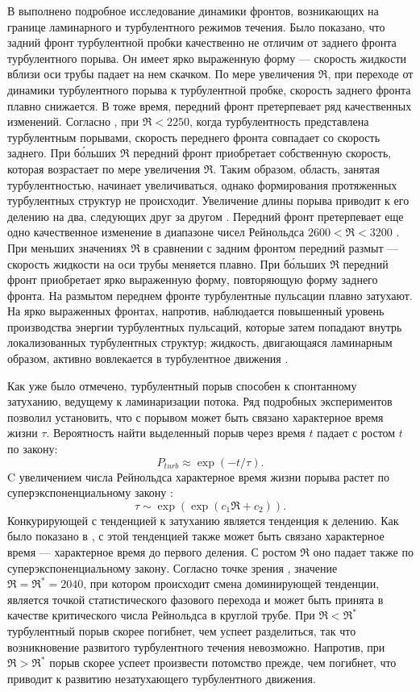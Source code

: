 В \cite{Moxey2010, Barkley2015, Song2017} выполнено подробное исследование динамики фронтов, возникающих на границе ламинарного и турбулентного режимов течения. Было показано, что задний фронт турбулентной пробки качественно не отличим от заднего фронта турбулентного порыва. Он имеет ярко выраженную форму --- скорость жидкости вблизи оси трубы падает на нем скачком. По мере увеличения $\Re$, при переходе от динамики турбулентного порыва к турбулентной пробке, скорость заднего фронта плавно снижается. В тоже время, передний фронт претерпевает ряд качественных изменений. Согласно \cite{Moxey2010}, при $\Re < 2250$, когда турбулентность представлена турбулентным порывами, скорость переднего фронта совпадает со скорость заднего. При б\'{о}льших $\Re$ передний фронт приобретает собственную скорость, которая возрастает по мере увеличения $\Re$. Таким образом, область, занятая турбулентностью, начинает увеличиваться, однако формирования протяженных турбулентных структур не происходит. Увеличение длины порыва приводит к его делению на два, следующих друг за другом \cite{Moxey2010}. Передний фронт претерпевает еще одно качественное изменение в диапазоне чисел Рейнольдса $2600 < \Re < 3200$ \cite{Barkley2015}. При меньших значениях $\Re$ в сравнении с задним фронтом передний размыт --- скорость жидкости на оси трубы меняется плавно. При б\'{о}льших $\Re$ передний фронт приобретает ярко выраженную форму, повторяющую форму заднего фронта. На размытом переднем фронте турбулентные пульсации плавно затухают. На ярко выраженных фронтах, напротив, наблюдается повышенный уровень производства энергии турбулентных пульсаций, которые затем попадают внутрь локализованных турбулентных структур; жидкость, двигающаяся ламинарным образом, активно вовлекается в турбулентное движения \cite{Song2017}. 

Как уже было отмечено, турбулентный порыв способен к спонтанному затуханию, ведущему к ламинаризации потока. Ряд подробных экспериментов \cite{Hof2006finite, Willis2007, Peixinho2007} позволил установить, что с порывом может быть связано характерное время жизни $\tau$. Вероятность найти выделенный порыв через время $t$ падает с ростом $t$ по закону:
$$P_{turb} \approx \exp(-t/\tau).$$ 
C увеличением числа Рейнольдса характерное время жизни порыва растет по суперэкспоненциальному закону \cite{Hof2008, Kuik2010}:
$$\tau \sim \exp(\exp(c_1 \Re + c_2)).$$ 
Конкурирующей с тенденцией к затуханию является тенденция к делению. Как было показано в \cite{Avila2011}, с этой тенденцией также может быть связано характерное время --- характерное время до первого деления. С ростом $\Re$ оно падает также по суперэкспоненциальному закону. Согласно точке зрения \cite{Avila2011}, значение $\Re=\Re^*=2040$, при котором происходит смена доминирующей тенденции, является точкой статистического фазового перехода и может быть принята в качестве критического числа Рейнольдса в круглой трубе. При $\Re<\Re^*$ турбулентный порыв скорее погибнет, чем успеет разделиться, так что возникновение развитого турбулентного течения невозможно. Напротив, при $\Re>\Re^*$ порыв скорее успеет произвести потомство прежде, чем погибнет, что приводит к развитию незатухающего турбулентного движения. 

